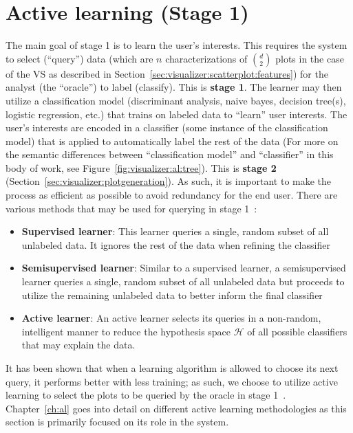 \section{Active learning (Stage 1)}
\label{sec:visualizer:al}

The main goal of stage 1 is to learn the user's interests. This requires the 
system to select (``query'') data (which are $n$ characterizations of $d\choose 
2$ plots in the case of the VS as described in 
Section~\ref{sec:visualizer:scatterplot:features}) for the analyst (the 
``oracle'') to label (classify). This is \textbf{stage 1}. 
The learner may then utilize 
a classification model (discriminant analysis, naive bayes, decision tree(s), 
logistic regression, etc.) that trains on labeled data to ``learn'' user 
interests. The user's interests are encoded in a classifier (some instance of 
the classification model) that is applied to automatically label the rest of 
the data (For more on the 
semantic differences between ``classification model'' and ``classifier'' in 
this body of work, see Figure~\ref{fig:visualizer:al:tree}). This is 
\textbf{stage 2} (Section~\ref{sec:visualizer:plotgeneration}). 
As such, it is important to make the process as efficient as possible to avoid 
redundancy for the end user. There are various methods that may be used for 
querying in stage 1~\cite{dasgupta2011}:

\tablespacing
\begin{itemize}
	\item \textbf{Supervised learner}: This learner queries a single, random 
	subset of all unlabeled data. It ignores the rest of the data when refining 
	the classifier
	\item \textbf{Semisupervised learner}: Similar to a supervised learner, a 
	semisupervised learner queries a single, random subset of all 
	unlabeled data but proceeds to utilize the remaining unlabeled data to 
	better inform the final classifier
	\item \textbf{Active learner}: An active learner selects its queries in a 
	non-random, intelligent manner to reduce the hypothesis space $\mathcal{H}$ 
	of all possible classifiers that may explain the data.
\end{itemize}
\bodyspacing

It has been 
shown that when a learning algorithm is allowed to choose its next query, it 
performs better with less training; as such, we choose to utilize active 
learning to select the plots to be queried by the oracle in stage 
1~\cite{settles2010}. Chapter~\ref{ch:al} goes into detail on different active 
learning methodologies as this section is primarily focused on its role in the 
system.

